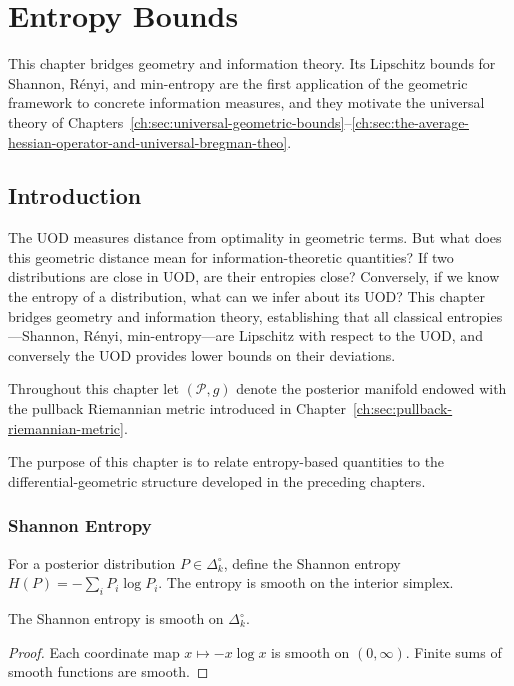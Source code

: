 \chapter[Entropy Bounds]{Entropy Bounds}\label{ch:sec:entropy-bounds}


This chapter bridges geometry and information theory. Its Lipschitz bounds for Shannon, R\'enyi, and min-entropy are the first application of the geometric framework to concrete information measures, and they motivate the universal theory of Chapters~\ref{ch:sec:universal-geometric-bounds}--\ref{ch:sec:the-average-hessian-operator-and-universal-bregman-theo}.


\section{Introduction}\label{ch:sec:introduction-entropy_bounds}
The UOD measures distance from optimality in geometric terms.  But what
does this geometric distance mean for information-theoretic quantities?
If two distributions are close in UOD, are their entropies close?
Conversely, if we know the entropy of a distribution, what can we infer
about its UOD?  This chapter bridges geometry and information theory,
establishing that all classical entropies---Shannon, R\'enyi,
min-entropy---are Lipschitz with respect to the UOD, and conversely the
UOD provides lower bounds on their deviations.

Throughout this chapter let $(\mathcal P,g)$ denote the posterior
manifold endowed with the pullback Riemannian metric introduced in
Chapter~\ref{ch:sec:pullback-riemannian-metric}.

The purpose of this chapter is to relate entropy-based quantities to the
differential-geometric structure developed in the preceding chapters.

\subsection{Shannon Entropy}\label{ch:sec:shannon-entropy}

For a posterior distribution $P\in\Delta_k^\circ$, define the Shannon entropy
$H(P)=-\sum_i P_i\log P_i$.
The entropy is smooth on the interior simplex.

\begin{proposition}
\label{ch:prop:11-1}
The Shannon entropy is smooth on $\Delta_k^\circ$.
\end{proposition}

\begin{proof}
Each coordinate map $x\mapsto -x\log x$ is smooth on $(0,\infty)$.
Finite sums of smooth functions are smooth.\end{proof}

